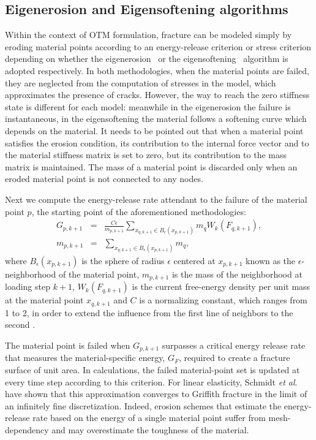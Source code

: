 \documentclass[applsci,journal,article,submit,moreauthors,pdftex]{Definitions/mdpi}
\begin{document}
\subsection{Eigenerosion and Eigensoftening algorithms}

Within the context of OTM formulation, fracture can be modeled simply by eroding material points according to an energy-release criterion or stress criterion depending on whether the eigenerosion~\cite{schmidt09, Pandolfi_12, Li_12, Pandolfi_13} or the eigensoftening~\cite{Navas2018a,Yu2018,Molinos2020b} algorithm is adopted respectively. In both methodologies, when the material points are failed, they are neglected from the computation of stresses in the model, which approximates the presence of cracks. However, the way to reach the zero stiffness state is different for each model: meanwhile in the eigenerosion the failure is instantaneous, in the eigensoftening the material follows a softening curve which depends on the material. It needs to be pointed out that when a material point satisfies the erosion condition, its contribution to the internal force vector and to the material stiffness matrix is set to zero, but its contribution to the mass matrix is maintained. The mass of a material point is discarded only when an eroded material point is not connected to any nodes.

Next we compute the energy-release rate attendant to the failure of the material point $p$, the starting point of the aforementioned methodologies:
\begin{eqnarray}
G_{p,k+1}&=&\frac{C\epsilon}{m_{p,k+1}}\sum_{x_{q,k+1}\in B_\epsilon (x_{p,k+1})}m_qW_k(F_{q,k+1}), \nonumber\\
m_{p,k+1}&=&\sum_{x_{q,k+1}\in B_\epsilon (x_{p,k+1})}m_q\label{eq10},
\end{eqnarray}
where $B_\epsilon (x_{p,k+1})$ is the sphere of radius $\epsilon$ centered at $x_{p,k+1}$ known as the $\epsilon$-neighborhood of the material point, $m_{p,k+1}$ is the mass of the neighborhood at loading step $k+1$, $W_k(F_{q,k+1})$ is the current free-energy density per unit mass at the material point $x_{q, k+1}$ and $C$ is a normalizing constant, which ranges from 1 to 2, in order to extend the influence from the first line of neighbors to the second \cite{schmidt09,Pandolfi_12}.

The material point is failed when $G_{p,k+1} $ surpasses a critical energy release rate that measures the material-specific energy, $G_F$, required to create a fracture surface of unit area. In calculations, the failed material-point set is updated at every time step according to  this criterion. For linear elasticity, Schmidt \textit{et al}.~\cite{schmidt09} have shown that this approximation converges to Griffith fracture in the limit of an infinitely fine discretization. 
Indeed, erosion schemes that estimate the energy-release rate based on the energy of a single material point suffer from mesh-dependency and may overestimate the toughness of the material.
\end{document}
